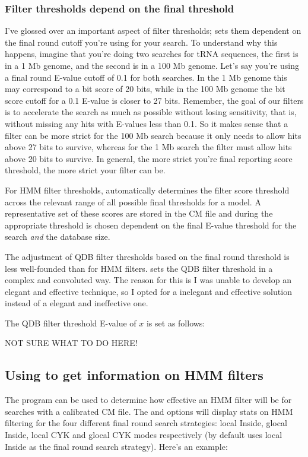 \subsubsection{Filter thresholds depend on the final threshold}
I've glossed over an important aspect of filter thresholds;
 sets them dependent on the final round cutoff you're
using for your search. To understand why this happens, imagine that
you're doing two searches for tRNA sequences, the first is in a 1 Mb
genome, and the second is in a 100 Mb genome. Let's say you're using a
final round E-value cutoff of 0.1 for both searches. In the 1 Mb
genome this may correspond to a bit score of 20 bits, while in the 100 Mb
genome the bit score cutoff for a 0.1 E-value is closer to 27
bits. Remember, the goal of our filters is to accelerate the search as
much as possible without losing sensitivity, that is, without missing
any hits with E-values less than 0.1.  So it makes sense that
a filter can be more strict for the 100 Mb search because it only
needs to allow hits above 27 bits to survive, whereas for the 1
Mb search the filter must allow hits above 20 bits to survive. In
general, the more strict you're final reporting score threshold, the
more strict your filter can be.

For HMM filter thresholds,  automatically determines
the filter score threshold across the relevant range of all possible
final thresholds for a model. A representative set of these scores are
stored in the CM file and during  the appropriate
threshold is chosen dependent on the final E-value threshold for the
search \emph{and} the database size.

The adjustment of QDB filter thresholds based on the final round
threshold is less well-founded than for HMM filters. 
sets the QDB filter threshold in a complex and convoluted way. The
reason for this is I was unable to develop an elegant and effective
technique, so I opted for a inelegant and effective solution
instead of a elegant and ineffective one. 

The QDB filter threshold E-value of $x$ is set as follows: 

NOT SURE WHAT TO DO HERE!

\subsection{Using  to get information on HMM filters}

The  program can be used to determine how effective an
HMM filter will be for searches with a calibrated CM file. The
 and  options will display stats on
HMM filtering for the four different final round search strategies:
local Inside, glocal Inside, local CYK and glocal CYK modes
respectively (by default  uses local Inside as the
final round search strategy). Here's an example:


